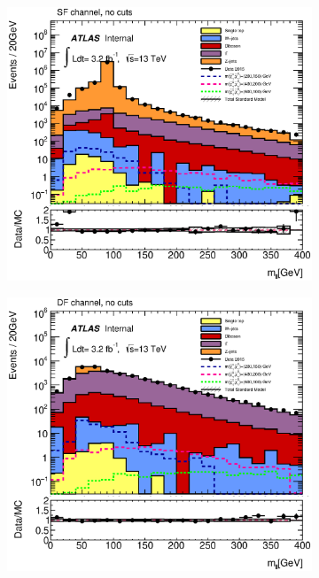 \begin{figure}[!th]	   
	\begin{subfigure}[t]{0.5\textwidth}
		\subcaption{} 
		\label{fig:SF_total_mll}
        \includegraphics[scale=0.38]{Chap4/SF_DileptonMll_13TeV_total_signal} 
        \end{subfigure} 
     \begin{subfigure}[t]{0.5\textwidth}
     \subcaption{}
     	\label{fig:DF_total_mll}
        \includegraphics[scale=0.38]{Chap4/Emu_DileptonMll_13TeV_total_signal} 

\end{subfigure}
\end{figure}
